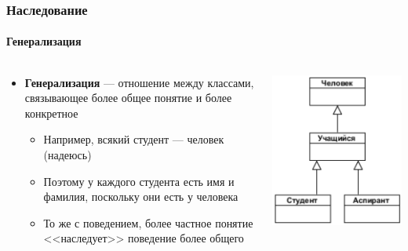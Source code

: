 \documentclass{../../slides-style}
\begin{document}
    \begin{frame}
        \frametitle{Наследование}
        \framesubtitle{Генерализация}
        \begin{columns}
            \begin{column}{0.75\textwidth}
                \begin{itemize}
                    \item \textbf{Генерализация} --- отношение между классами, связывающее более общее понятие и более конкретное
                    \begin{itemize}
                        \item Например, всякий студент --- человек (надеюсь)
                        \item Поэтому у каждого студента есть имя и фамилия, поскольку они есть у человека
                        \item То же с поведением, более частное понятие <<наследует>> поведение более общего
                    \end{itemize}
                \end{itemize}
            \end{column}
            \begin{column}{0.25\textwidth}
                \includegraphics[width=\textwidth]{inheritance.png}
            \end{column}
        \end{columns}
    \end{frame}
\end{document}

